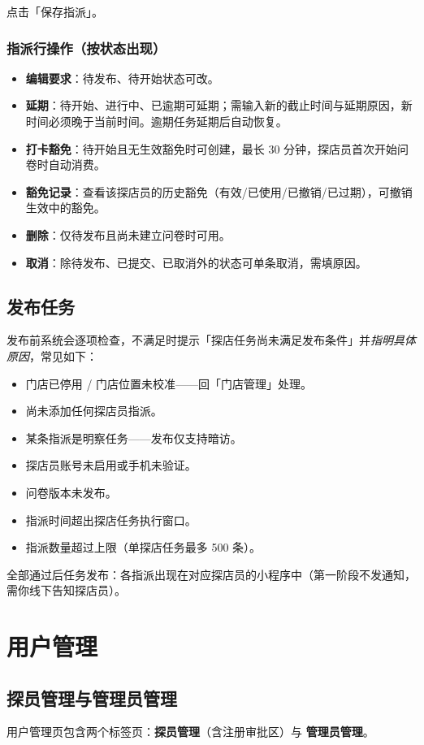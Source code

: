 \documentclass[12pt,a4paper,fontset=none]{ctexart}
\begin{document}
点击「保存指派」。

\subsubsection{指派行操作（按状态出现）}
\begin{itemize}
\item \textbf{编辑要求}：待发布、待开始状态可改。
\item \textbf{延期}：待开始、进行中、已逾期可延期；需输入新的截止时间与延期原因，新时间必须晚于当前时间。逾期任务延期后自动恢复。
\item \textbf{打卡豁免}：待开始且无生效豁免时可创建，最长 30 分钟，探店员首次开始问卷时自动消费。
\item \textbf{豁免记录}：查看该探店员的历史豁免（有效/已使用/已撤销/已过期），可撤销生效中的豁免。
\item \textbf{删除}：仅待发布且尚未建立问卷时可用。
\item \textbf{取消}：除待发布、已提交、已取消外的状态可单条取消，需填原因。
\end{itemize}

\subsection{发布任务}
发布前系统会逐项检查，不满足时提示「探店任务尚未满足发布条件」并\emph{指明具体原因}，常见如下：

\begin{itemize}
\item 门店已停用 / 门店位置未校准——回「门店管理」处理。
\item 尚未添加任何探店员指派。
\item 某条指派是明察任务——发布仅支持暗访。
\item 探店员账号未启用或手机未验证。
\item 问卷版本未发布。
\item 指派时间超出探店任务执行窗口。
\item 指派数量超过上限（单探店任务最多 500 条）。
\end{itemize}

全部通过后任务发布：各指派出现在对应探店员的小程序中（第一阶段不发通知，需你线下告知探店员）。

\section{用户管理}

\subsection{探员管理与管理员管理}
用户管理页包含两个标签页：\textbf{探员管理}（含注册审批区）与 \textbf{管理员管理}。
\end{document}

